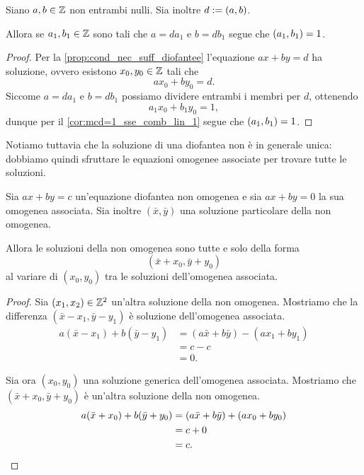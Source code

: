 \begin{corollary}
    Siano $a, b \in \mathbb{Z}$ non entrambi nulli. Sia inoltre $d := \left(a, b\right)$.

    Allora se $a_1, b_1 \in \mathbb{Z}$ sono tali che $a = da_1$ e $b = db_1$ segue che $\left(a_1, b_1\right) = 1$.
\end{corollary}
\begin{proof}
    Per la \autoref{prop:cond_nec_suff_diofantee} l'equazione $ax + by = d$ ha soluzione, ovvero esistono $x_0, y_0 \in \mathbb{Z}$ tali che \[
        ax_0 + by_0 = d.
    \] Siccome $a = da_1$ e $b = db_1$ possiamo dividere entrambi i membri per $d$, ottenendo \[
        a_1x_0 + b_1y_0 = 1,    
    \] dunque per il \autoref{cor:mcd=1_sse_comb_lin_1} segue che $\left(a_1, b_1\right) = 1$.
\end{proof}

Notiamo tuttavia che la soluzione di una diofantea non è in generale unica: dobbiamo quindi sfruttare le equazioni omogenee associate per trovare tutte le soluzioni.

\begin{proposition}
    Sia $ax + by = c$ un'equazione diofantea non omogenea e sia $ax + by = 0$ la sua omogenea associata.
    Sia inoltre $(\bar x, \bar y)$ una soluzione particolare della non omogenea. 
    
    Allora le soluzioni della non omogenea sono tutte e solo della forma \begin{equation}
        (\bar x + x_0, \bar y + y_0)
    \end{equation} al variare di $(x_0, y_0)$ tra le soluzioni dell'omogenea associata.
\end{proposition}
\begin{proof}
    Sia $(x_1, x_2) \in \mathbb{Z}^2$ un'altra soluzione della non omogenea. Mostriamo che la differenza $(\bar x - x_1, \bar y - y_1)$ è soluzione dell'omogenea associata.
    \begin{align*}
        a(\bar x - x_1) + b(\bar y - y_1) &= (a\bar x + b\bar y) - (ax_1 + by_1) \\
        &= c - c \\
        &= 0.
    \end{align*}

    Sia ora $(x_0, y_0)$ una soluzione generica dell'omogenea associata. Mostriamo che $(\bar x + x_0, \bar y + y_0)$ è un'altra soluzione della non omogenea.
    \begin{align*}
        a(\bar x + x_0) + b(\bar y + y_0) &= (a\bar x + b\bar y) + (ax_0 + by_0) \\
        &= c + 0 \\
        &= c. \qedhere
    \end{align*}
\end{proof}


